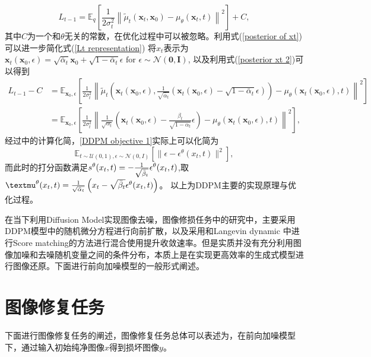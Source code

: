 \begin{equation}
    L_{t-1}=\mathbb{E}_q\left[\frac{1}{2 \sigma_t^2}\left\|\tilde{{\mu}}_t\left(\mathbf{x}_t, \mathbf{x}_0\right)-{\mu}_\theta\left(\mathbf{x}_t, t\right)\right\|^2\right]+C,
    \label{Lt representation}
\end{equation}
其中$C$为一个和$\theta$无关的常数，在优化过程中可以被忽略。利用式(\ref{posterior of xt})可以进一步简化式(\ref{Lt representation}) 将$x_t$表示为$\mathbf{x}_t\left(\mathbf{x}_0, {\epsilon}\right)=\sqrt{\bar{\alpha}_t} \mathbf{x}_0+\sqrt{1-\bar{\alpha}_t} {\epsilon} \text { for } {\epsilon} \sim \mathcal{N}(\mathbf{0}, \mathbf{I}) $, 以及利用式(\ref{posterior xt 2})可以得到
\begin{align}
    L_{t-1}-C&=\mathbb{E}_{\mathbf{x}_0, {\epsilon}}\left[\frac{1}{2 \sigma_t^2}\left\|\tilde{{\mu}}_t\left(\mathbf{x}_t\left(\mathbf{x}_0, {\epsilon}\right), \frac{1}{\sqrt{\bar{\alpha}_t}}\left(\mathbf{x}_t\left(\mathbf{x}_0, {\epsilon}\right)-\sqrt{1-\bar{\alpha}_t} {\epsilon}\right)\right)-{\mu}_\theta\left(\mathbf{x}_t\left(\mathbf{x}_0, {\epsilon}\right), t\right)\right\|^2\right]\\
&=\mathbb{E}_{\mathbf{x}_0, {\epsilon}}\left[\frac{1}{2 \sigma_t^2}\left\|\frac{1}{\sqrt{\alpha_t}}\left(\mathbf{x}_t\left(\mathbf{x}_0, {\epsilon}\right)-\frac{\beta_t}{\sqrt{1-\bar{\alpha}_t}} {\epsilon}\right)-{\mu}_\theta\left(\mathbf{x}_t\left(\mathbf{x}_0, {\epsilon}\right), t\right)\right\|^2\right],
\end{align}
经过\cite{DDPM,score_based_SDE}中的计算化简，\ref{DDPM objective 1}实际上可以化简为
\begin{equation}
    \mathbb{E}_{t\sim \mathcal{U}(0,1),\epsilon\sim \mathcal{N}(0,I)}\left[\|\epsilon - \epsilon^{\theta}(x_t,t)\|^2\right],
    \end{equation}
而此时的打分函数满足$s^{\theta}(x_t,t) =- \frac{1}{\sqrt{\Bar{\beta}_t}}\epsilon^{\theta}(x_t,t)$,取 $\mu^{\theta}(x_t,t) = \frac{1}{\sqrt{\Bar{\alpha}_t}}\left(x_t- \sqrt{\Bar{\beta}_t}\epsilon^{\theta}(x_t,t)\right)$。 以上为DDPM主要的实现原理与优化过程。

在当下利用Diffusion Model实现图像去噪，图像修损任务中的研究中，主要采用DDPM模型中的随机微分方程进行向前扩散，以及采用和Langevin dynamic 中进行Score matching的方法进行混合使用提升收敛速率。但是实质并没有充分利用图像加噪和去噪随机变量之间的条件分布，本质上是在实现更高效率的生成式模型进行图像还原。下面进行前向加噪模型的一般形式阐述。
\section{图像修复任务}
下面进行图像修复任务的阐述，图像修复任务总体可以表述为，在前向加噪模型下，通过输入初始纯净图像$x$得到损坏图像$y$。

